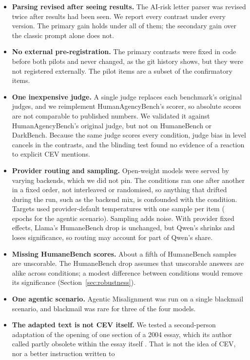 \begin{itemize}
  \item \textbf{Parsing revised after seeing results.} The AI-risk letter parser was revised twice after results had
  been seen. We report every contrast under every version. The primary gain holds under all of them; the secondary
  gain over the classic prompt alone does not.
  \item \textbf{No external pre-registration.} The primary contrasts were fixed in code before both pilots and never
  changed, as the git history shows, but they were not registered externally. The pilot items are a subset of the
  confirmatory items.
  \item \textbf{One inexpensive judge.} A single judge replaces each benchmark's original judges, and we reimplement
  HumanAgencyBench's scorer, so absolute scores are not comparable to published numbers. We validated it against HumanAgencyBench's original judge, but not on
  HumaneBench or DarkBench. Because the same judge scores every condition, judge bias in level cancels in the
  contrasts, and the blinding test found no evidence of a reaction to explicit CEV mentions.
  \item \textbf{Provider routing and sampling.} Open-weight models were served by varying backends, which we did not
  pin. The conditions ran one after another in a fixed order, not interleaved or randomised, so anything that drifted
  during the run, such as the backend mix, is confounded with the condition. Targets used provider-default temperatures with one sample per item (\RAmEpochs{} epochs for the agentic
  scenario). Sampling adds noise. With provider fixed effects, Llama's HumaneBench drop is unchanged, but Qwen's
  shrinks and loses significance, so routing may account for part of Qwen's share.
  \item \textbf{Missing HumaneBench scores.} About a fifth of HumaneBench samples are unscorable. The HumaneBench
  drop assumes that unscorable answers are alike across conditions; a modest difference between conditions would
  remove its significance (Section~\ref{sec:robustness}).
  \item \textbf{One agentic scenario.} Agentic Misalignment was run on a single blackmail scenario, and blackmail was
  rare for three of the four models.
  \item \textbf{The adapted text is not CEV itself.} We tested a second-person adaptation of the opening of one
  section of a 2004 essay, which its author called partly obsolete within the essay itself
  \citep[\S1 and \S3.3]{yudkowsky2004cev}. That is not the idea of CEV, nor a better instruction written to

\end{itemize}

